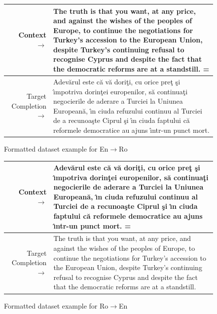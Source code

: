 \documentclass{article}
\begin{document}
\begin{figure} { \tt \footnotesize \begin{tabularx}{\linewidth}{r X} \toprule Context $\to$ & The truth is that you want, at any price, and against the wishes of the peoples of Europe, to continue the negotiations for Turkey's accession to the European Union, despite Turkey's continuing refusal to recognise Cyprus and despite the fact that the democratic reforms are at a standstill. = \\ 
 \midrule Target Completion $\to$ & Adev\u{a}rul este c\u{a} v\u{a} dori\c{t}i, cu orice pre\c{t} \c{s}i {\^\i}mpotriva dorin\c{t}ei europenilor, s\u{a} continua\c{t}i negocierile de aderare a Turciei la Uniunea European\u{a}, {\^\i}n ciuda refuzului continuu al Turciei de a recunoa\c{s}te Ciprul \c{s}i {\^\i}n ciuda faptului c\u{a} reformele democratice au ajuns {\^\i}ntr-un punct mort. \\
\bottomrule \end{tabularx} }  \caption{Formatted dataset example for En$\to$Ro}  \label{eval:En_Ro}  \end{figure}
\begin{figure} { \tt \footnotesize \begin{tabularx}{\linewidth}{r X} \toprule Context $\to$ & Adev\u{a}rul este c\u{a} v\u{a} dori\c{t}i, cu orice pre\c{t} \c{s}i {\^\i}mpotriva dorin\c{t}ei europenilor, s\u{a} continua\c{t}i negocierile de aderare a Turciei la Uniunea European\u{a}, {\^\i}n ciuda refuzului continuu al Turciei de a recunoa\c{s}te Ciprul \c{s}i {\^\i}n ciuda faptului c\u{a} reformele democratice au ajuns {\^\i}ntr-un punct mort. = \\ 
 \midrule Target Completion $\to$ & The truth is that you want, at any price, and against the wishes of the peoples of Europe, to continue the negotiations for Turkey's accession to the European Union, despite Turkey's continuing refusal to recognise Cyprus and despite the fact that the democratic reforms are at a standstill. \\

\bottomrule \end{tabularx} }  \caption{Formatted dataset example for Ro$\to$En}  \label{eval:Ro_En}  \end{figure}
\end{document}

